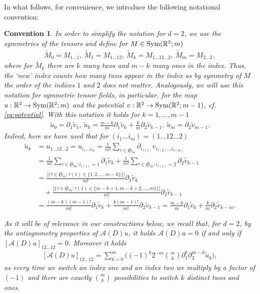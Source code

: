 \documentclass[a4paper, 10pt, twoside, notitlepage]{amsart}
\theoremstyle{plain}
\newtheorem{con}[prop]{Convention}
\newcommand{\R}{\mathbb{R}}
\newcommand{\p}{\partial}
\newcommand{\A}{\mathcal{A}}
\begin{document}
		In what follows, for convenience, we introduce the following notational convention:
		
                \begin{con} \label{rmk:Notation-2D}
                   In order to simplify the notation for $d=2$, we use the symmetries of the tensors and define for $M \in \textup{Sym}(\R^2;m)$
                    \begin{align*}
                      \tilde{M}_0 = M_{1\dots1}, \ \tilde{M}_1 = M_{1\dots12}, \ \tilde{M}_k = M_{1\dots12\dots2},\  \tilde{M}_m = M_{2\dots2},
                    \end{align*}
                    where for $\tilde{M}_k$ there are $k$ many twos and $m-k$ many ones in the index.  Thus, the `new' index counts how many twos appear in the index as by symmetry of $M$ the order of the indices $1$ and $2$ does not matter.  Analogously, we will use this notation for symmetric tensor fields, in particular, for the map $u:\R^2 \to \textup{Sym}(\R^2;m)$ and the potential $v:\R^2 \to \textup{Sym}(\R^2;m-1)$, cf. \cref{eq:potential}.  With this notation it
                    holds for $k =1,\dots,m-1$
                    \begin{align*}
                      \tilde{u}_0 = \p_1 \tilde{v}_1,\ \tilde{u}_k = \frac{m-k}{m} \p_1 \tilde{v}_{k} + \frac{k}{m} \p_2 \tilde{v}_{k-1},\ \tilde{u}_m = \p_2 \tilde{v}_{m-1}.
                    \end{align*}
			Indeed, here we have used that for $(i_1 \dots i_m)=(1\dots12\dots2)$
			\begin{align*}
				\tilde{u}_k &= u_{1\dots12\dots2} = u_{i_1 \dots i_m} =  \frac{1}{m!} \sum_{\tau \in \mathfrak{S}_m} \p_{i_{\tau(1)}} v_{i_{\tau(2)} \dots i_{\tau(m)}} \\
				& = \frac{1}{m!} \sum_{\tau \in \mathfrak{S}_m: i_{\tau(1)} = 1} \p_1 \tilde{v}_{k} + \frac{1}{m!} \sum_{\tau \in \mathfrak{S}_m: i_{\tau(1)} = 2} \p_2 \tilde{v}_{k-1} \\
				& = \frac{|\{\tau \in \mathfrak{S}_m: \tau(1) \in \{1,2,\dots,m-k\}\}|}{m!} \p_1 \tilde{v}_k \\
				& \quad + \frac{|\{\tau \in \mathfrak{S}_m: \tau(1) \in \{m-k+1,m-k+2,\dots,m\}\}|}{m!} \p_2 \tilde{v}_{k-1} \\
				& = \frac{(m-k) (m-1)!}{m!} \p_1 \tilde{v}_k + \frac{k (m-1)!}{m!} \p_2 \tilde{v}_{k-1} = \frac{m-k}{m} \p_1 \tilde{v}_{k} + \frac{k}{m} \p_2 \tilde{v}_{k-m}.
			\end{align*}
		
		
		As it will be of relevance in our constructions below, we recall that, for $d=2$, by the antisymmetry properties of $\A(D)u$, it holds $\A(D)u = 0$ if and only if
		$[\A(D)u]_{12\dots12} = 0$.  Moreover it holds
		\begin{align}
                  \label{eq:Operator2d} [\A(D)u]_{12\dots12} = \sum_{k=0}^m \Big( (-1)^k 2^{-m} \binom{m}{k} \p_1^k \p_2^{m-k} \tilde{u}_k \Big),
		\end{align}
		as every time we switch an index one and an index two we multiply by a factor of $(-1)$ and there are exactly $\binom{m}{k}$ possibilities to switch $k$ distinct twos and ones.
              \end{con}
		
\end{document}
